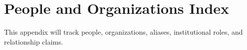 \chapter{People and Organizations Index}


This appendix will track people, organizations, aliases, institutional roles, and relationship claims.

